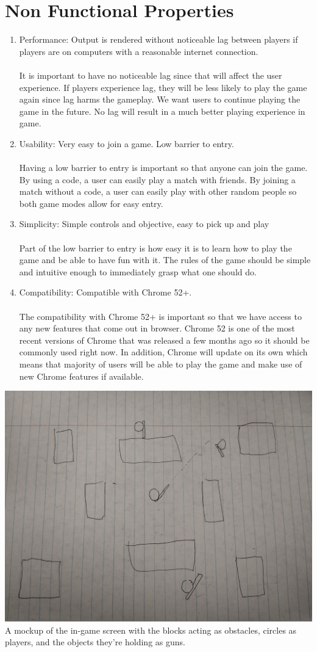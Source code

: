 \documentclass[11pt, oneside]{article}   	%
\begin{document}
\section{Non Functional Properties}
\begin{enumerate}
\item
Performance:  Output is rendered without noticeable lag between players if players are on
computers with a reasonable internet connection. \\\\
It is important to have no noticeable lag since that will affect the user
experience. If players experience lag, they will be less likely to play the
game again since lag harms the gameplay. We want users to continue playing
the game in the future. No lag will result in a much better playing
experience in game.
\item
Usability: Very easy to join a game. Low barrier to entry.\\\\
Having a low barrier to entry is important so that anyone can join the game. By
using a code, a user can easily play a match with friends. By joining a
match without a code, a user can easily play with other random people so
both game modes allow for easy entry.
\item
Simplicity:  Simple controls and objective, easy to pick up and play\\\\
Part of the low barrier to entry is how easy it is to learn how to
play the game and be able to have fun with it.  The rules of the game
should be simple and intuitive enough to immediately grasp what
one should do.
\item
Compatibility: Compatible with Chrome 52+.\\\\
The compatibility with Chrome 52+ is important so that we have access to any
new features that come out in browser. Chrome 52 is one of the most recent
versions of Chrome that was released a few months ago so it should be
commonly used right now. In addition, Chrome will update on its own which
means that majority of users will be able to play the game and make use of
new Chrome features if available.

\end{enumerate}

\clearpage

\includegraphics[scale=.085]{mockup.jpg}\\
A mockup of the in-game screen with the blocks acting as obstacles, circles as players, and the objects they're holding as guns.
\end{document}
